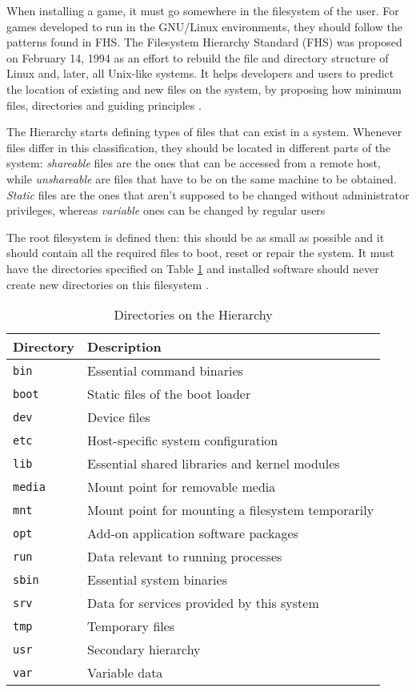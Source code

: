When installing a game, it must go somewhere in the filesystem of the user. For games developed to run in the GNU/Linux environments, they should follow the patterns found in FHS. The Filesystem Hierarchy Standard (FHS) was proposed on February 14, 1994 as an effort to rebuild the file and directory structure of Linux and, later, all Unix-like systems. It helps developers and users to predict the location of existing and new files on the system, by proposing how minimum files, directories and guiding principles \cite{bandel2001special}.

The Hierarchy starts defining types of files that can exist in a system. Whenever files differ in this classification, they should be located in different parts of the system: \textit{shareable} files are the ones that can be accessed from a remote host, while \textit{unshareable} are files that have to be on the same machine to be obtained. \textit{Static} files are the ones that aren't supposed to be changed without administrator privileges, whereas \textit{variable} ones can be changed by regular users \cite{bandel2001special}

The root filesystem is defined then: this should be as small as possible and it should contain all the required files to boot, reset or repair the system. It must have the directories specified on Table \ref{tab:directories} and installed software should never create new directories on this filesystem \cite{allbery2015filesystem}.


\begin{table}[h!]
\centering
\caption{Directories on the Hierarchy \cite{allbery2015filesystem}}
\label{tab:directories}
\begin{tabular}{ll}
\toprule
\textbf{Directory} & \textbf{Description} \\
\midrule
\texttt{bin} & Essential command binaries \\
\texttt{boot} & Static files of the boot loader \\
\texttt{dev} & Device files \\
\texttt{etc} & Host-specific system configuration \\
\texttt{lib} & Essential shared libraries and kernel modules \\
\texttt{media} & Mount point for removable media \\
\texttt{mnt} & Mount point for mounting a filesystem temporarily \\
\texttt{opt} & Add-on application software packages \\
\texttt{run} & Data relevant to running processes \\
\texttt{sbin} & Essential system binaries \\
\texttt{srv} & Data for services provided by this system \\
\texttt{tmp} & Temporary files \\
\texttt{usr} & Secondary hierarchy \\
\texttt{var} & Variable data \\
\bottomrule
\end{tabular}
\end{table}


